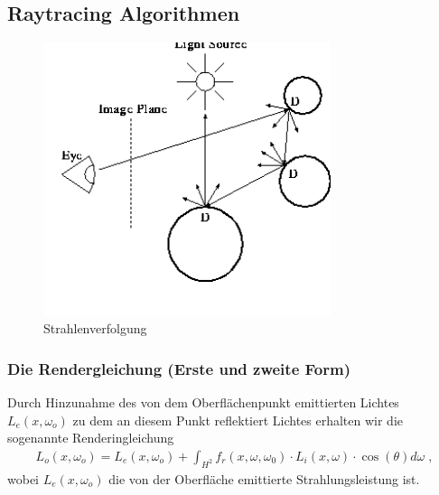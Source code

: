 \subsection{Raytracing Algorithmen}
 \begin{figure}[H]
    \centering
    \includegraphics[width=0.75\textwidth]{images/rayTracing.png}
    \caption{Strahlenverfolgung}
    \label{fig:diffus}
\end{figure}

 
\subsubsection{Die Rendergleichung (Erste und zweite Form)}

Durch Hinzunahme des von dem Oberflächenpunkt emittierten Lichtes $L_e(x, \omega_o)$ zu dem   an diesem Punkt reflektiert Lichtes erhalten wir die sogenannte Renderingleichung 
\begin{align}
L_o(x, \omega_o) = L_e(x, \omega_o)  + \displaystyle \int_{H^2}f_r (x, \omega, \omega_0) \cdot L_i(x, \omega)  \cdot  \cos(\theta) d\omega \; ,
\end{align}
wobei $L_e(x, \omega_o)$ die von der Oberfläche emittierte Strahlungsleistung ist. 

